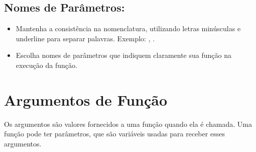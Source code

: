 \documentclass[letterpaper,10pt,english]{jupyterBook}
\begin{document}
\subsection{Nomes de Parâmetros:}
\label{\detokenize{chapters/ch5/ch5:nomes-de-parametros}}\begin{itemize}
\item {} 
\sphinxAtStartPar
{} Mantenha a consistência na nomenclatura, utilizando letras minúsculas e underline para separar palavras. Exemplo: , .

\item {} 
\sphinxAtStartPar
{} Escolha nomes de parâmetros que indiquem claramente sua função na execução da função.

\end{itemize}


\section{Argumentos de Função}
\label{\detokenize{chapters/ch5/ch5:argumentos-de-funcao}}
\sphinxAtStartPar
Os argumentos são valores fornecidos a uma função quando ela é chamada. Uma função pode ter parâmetros, que são variáveis usadas para receber esses argumentos.

\sphinxAtStartPar
{}

\begin{sphinxVerbatim}[commandchars=\\\{\}]
  
        
     

   
\end{sphinxVerbatim}

\begin{sphinxVerbatim}[commandchars=\\\{\}]
   
\end{sphinxVerbatim}
\end{document}

